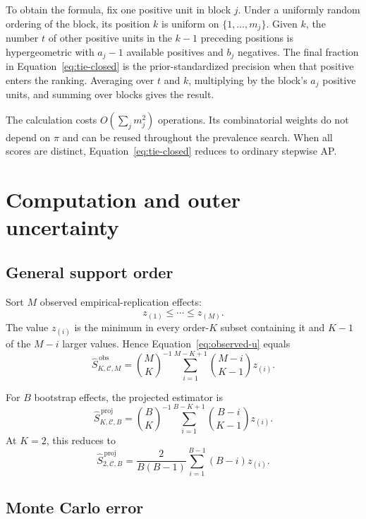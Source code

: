 \documentclass[11pt]{article}
\newcommand{\CSet}{\mathcal{C}}
\theoremstyle{remark}
\begin{document}
To obtain the formula, fix one positive unit in block $j$. Under a uniformly random ordering of the block, its position $k$ is uniform on $\{1,\ldots,m_j\}$. Given $k$, the number $t$ of other positive units in the $k-1$ preceding positions is hypergeometric with $a_j-1$ available positives and $b_j$ negatives. The final fraction in Equation~\eqref{eq:tie-closed} is the prior-standardized precision when that positive enters the ranking. Averaging over $t$ and $k$, multiplying by the block's $a_j$ positive units, and summing over blocks gives the result.

The calculation costs $O(\sum_jm_j^2)$ operations. Its combinatorial weights do not depend on $\pi$ and can be reused throughout the prevalence search. When all scores are distinct, Equation~\eqref{eq:tie-closed} reduces to ordinary stepwise AP.

\section{Computation and outer uncertainty}
\label{app:computation}

\subsection{General support order}

Sort $M$ observed empirical-replication effects:
\[
z_{(1)}\leq\cdots\leq z_{(M)}.
\]
The value $z_{(i)}$ is the minimum in every order-$K$ subset containing it and $K-1$ of the $M-i$ larger values. Hence Equation~\eqref{eq:observed-u} equals
\begin{equation}
\widehat S_{K,\CSet,M}^{\,\mathrm{obs}}
=
\binom MK^{-1}
\sum_{i=1}^{M-K+1}
\binom{M-i}{K-1}z_{(i)}.
\label{eq:sorted-observed}
\end{equation}

For $B$ bootstrap effects, the projected estimator is
\begin{equation}
\widehat S_{K,\CSet,B}^{\,\mathrm{proj}}
=
\binom BK^{-1}
\sum_{i=1}^{B-K+1}
\binom{B-i}{K-1}z_{(i)}.
\label{eq:sorted-bootstrap}
\end{equation}
At $K=2$, this reduces to
\[
\widehat S_{2,\CSet,B}^{\,\mathrm{proj}}
=
\frac{2}{B(B-1)}
\sum_{i=1}^{B-1}(B-i)z_{(i)}.
\]

\subsection{Monte Carlo error}
\end{document}
